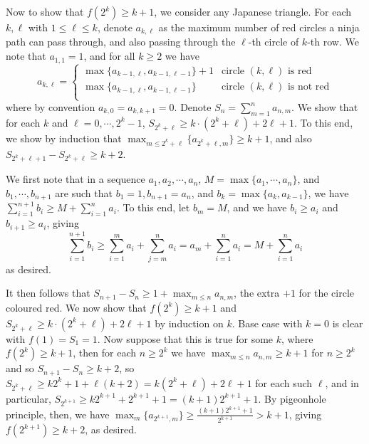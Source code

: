 \documentclass[11pt,a4paper]{article}
\begin{document}
\begin{enumerate}
    	Now to show that $f(2^k)\ge k + 1$, we consider any Japanese triangle. 
    	For each $k, \ell$ with $1\le \ell \le k$, 
    	denote $a_{k, \ell}$ as the maximum number of red circles a ninja path can pass through, 
    	and also passing through the $\ell$-th circle of $k$-th row. 
    	We note that $a_{1, 1} = 1$, and for all $k\ge 2$ we have 
    	\[
    	a_{k, \ell}
    	=\begin{cases}
    		\max \{a_{k - 1, \ell}, a_{k - 1, \ell - 1}\} + 1 & \text{circle $(k, \ell)$ is red}\\
    		\max \{a_{k - 1, \ell}, a_{k - 1, \ell - 1}\} & \text{circle $(k, \ell)$ is not red}\\
    	\end{cases}
    	\]
    	where by convention $a_{k, 0} = a_{k, k + 1} = 0$. 
    	Denote $S_n = \sum_{m=1}^n a_{n, m}$. We show that for each $k$ and $\ell = 0, \cdots, 2^k - 1$, 
    	$S_{2^k + \ell}\ge k\cdot (2^k + \ell) + 2\ell + 1$. 
    	To this end, we show by induction that 
    	$\max_{m\le 2^k + \ell} \{a_{2^k + \ell, m}\}\ge k + 1$, 
    	and also $S_{2^k + \ell + 1} - S_{2^k + \ell}\ge k + 2$. 
    	
    	We first note that in a sequence 
    	$a_1, a_2, \cdots, a_n$, $M = \max \{a_1, \cdots, a_n\}$, 
    	and $b_1, \cdots, b_{n + 1}$ are such that $b_1 = 1, b_{n + 1} = a_n$, 
    	and $b_k = \max\{a_k, a_{k - 1}\}$, 
    	we have $\sum_{i=1}^{n + 1} b_i\ge M + \sum_{i=1}^n a_i$. 
    	To this end, let $b_m = M$, 
    	and we have $b_i\ge a_i$ and $b_{i + 1}\ge a_i$, 
    	giving 
    	\[\sum_{i=1}^{n + 1} b_i\ge \sum_{i=1}^{m} a_i + \sum_{j=m}^n a_i = a_m + \sum_{i=1}^n a_i = M + \sum_{i=1}^n a_i
    	\]
    	as desired. 
    	
    	It then follows that $S_{n + 1} - S_n\ge 1 + \max_{m\le n} a_{n, m}$, 
    	the extra $+1$ for the circle coloured red. 
    	We now show that $f(2^k)\ge k + 1$ and $S_{2^k + \ell}\ge k\cdot (2^k + \ell)+2\ell + 1$ by induction on $k$. 
    	Base case with $k=0$ is clear with $f(1)=S_1 = 1$. 
    	Now suppose that this is true for some $k$, where $f(2^k)\ge k + 1$, 
    	then for each $n\ge 2^k$ we have 
    	$\max_{m\le n} a_{n, m}\ge k + 1$ for $n\ge 2^k$ and so $S_{n + 1} - S_n\ge k + 2$, 
    	so $S_{2^k + \ell}\ge k2^k + 1 + \ell(k + 2) = k(2^k+\ell) + 2\ell + 1$ for each such $\ell$, 
    	and in particular, 
    	$S_{2^{k+1}}\ge k2^{k+1}+2^{k+1}+1=(k + 1)2^{k+1} + 1$. 
    	By pigeonhole principle, then, 
    	we have $\max_m \{a_{2^{k+1}, m}\}\ge \frac{(k + 1)2^{k+1} + 1}{2^{k+1}} > k + 1$, 
    	giving $f(2^{k + 1})\ge k + 2$, as desired. 
    	

\end{enumerate}
\end{document}
